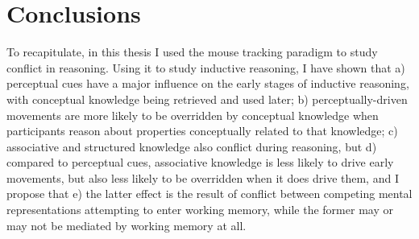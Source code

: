 



\section{Conclusions}

To recapitulate, in this thesis I used the mouse tracking paradigm
to study conflict in reasoning.
Using it to study inductive reasoning, I have shown that
a) perceptual cues have a major influence on
the early stages of inductive reasoning,
with conceptual knowledge being retrieved and used later;
b) perceptually-driven movements are more likely to be
overridden by conceptual knowledge when participants reason about
properties conceptually related to that knowledge;
c) associative and structured knowledge also conflict during reasoning, but
d) compared to perceptual cues, associative knowledge
is less likely to drive early movements,
but also less likely to be overridden when it does drive them,
and I propose that
e) the latter effect is the result of conflict between
competing mental representations attempting to enter working memory,
while the former may or may not be mediated by working memory at all.

